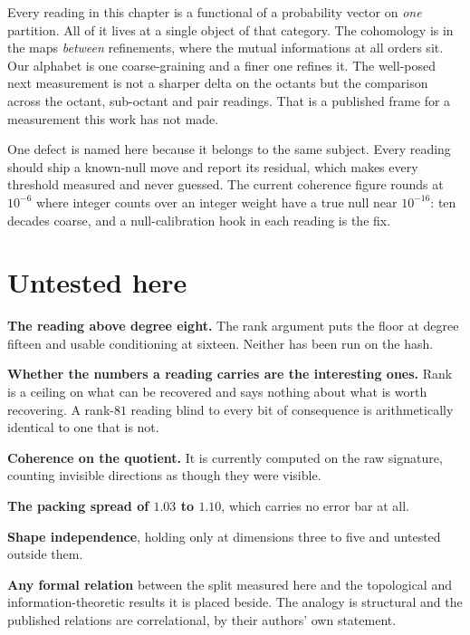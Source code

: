 Every reading in this chapter is a functional of a probability vector on \emph{one} partition. All of it lives at a single object of that category. The cohomology is in the maps \emph{between} refinements, where the mutual informations at all orders sit. Our alphabet is one coarse-graining and a finer one refines it. The well-posed next measurement is not a sharper delta on the octants but the comparison across the octant, sub-octant and pair readings. That is a published frame for a measurement this work has not made.

One defect is named here because it belongs to the same subject. Every reading should ship a known-null move and report its residual, which makes every threshold measured and never guessed. The current coherence figure rounds at \(10^{-6}\) where integer counts over an integer weight have a true null near \(10^{-16}\): ten decades coarse, and a null-calibration hook in each reading is the fix.

\section{Untested here}

\textbf{The reading above degree eight.} The rank argument puts the floor at degree fifteen and usable conditioning at sixteen. Neither has been run on the hash.

\textbf{Whether the numbers a reading carries are the interesting ones.} Rank is a ceiling on what can be recovered and says nothing about what is worth recovering. A rank-\(81\) reading blind to every bit of consequence is arithmetically identical to one that is not.

\textbf{Coherence on the quotient.} It is currently computed on the raw signature, counting invisible directions as though they were visible.

\textbf{The packing spread of \(1.03\) to \(1.10\)}, which carries no error bar at all.

\textbf{Shape independence}, holding only at dimensions three to five and untested outside them.

\textbf{Any formal relation} between the split measured here and the topological and information-theoretic results it is placed beside. The analogy is structural and the published relations are correlational, by their authors' own statement.
